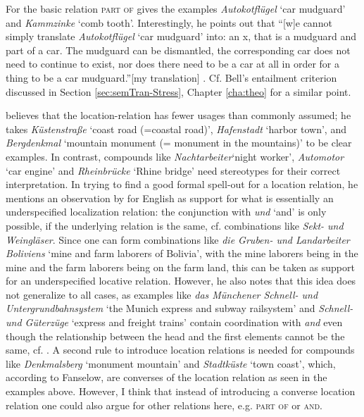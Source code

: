 For the basic relation \textsc{part of} \citet[184--185]{Fanselow:1981}
gives the examples \emph{Autokotflügel}  `car mudguard' and \emph{Kammzinke}
`comb tooth'. Interestingly, he points out that ``[w]e cannot simply translate \emph{Autokotflügel} `car mudguard'
  into: an x, that is a mudguard and part of a car. The mudguard can
  be dismantled, the corresponding car does not need to continue to
  exist, nor does there need to be a car at all in order for a thing
  to be a car mudguard.''[my translation]
  \citet[184]{Fanselow:1981}. Cf. \nocite{Bell:2012} Bell's entailment
  criterion discussed in Section \ref{sec:semTran-Stress}, Chapter
  \ref{cha:theo} for a similar point. 



\citet[185--186]{Fanselow:1981} believes that the location-relation has fewer usages than commonly
assumed; he takes \emph{Küstenstraße} `coast road (=coastal road)',
\emph{Ha\-fen\-stadt} `harbor town', and
\emph{Bergdenkmal} `mountain monument (= monument in the mountains)' to be clear examples. In contrast, compounds like
\emph{Nachtarbeiter}\linebreak[4] `night worker', \emph{Automotor}
  `car engine' and  \emph{Rheinbrücke} `Rhine bridge' need ste\-reo\-types for
  their correct interpretation. In trying to find a good formal spell-out for a
  location relation, he mentions an observation by \citet{Warren:1978} for English
  as support for what is essentially an underspecified localization
  relation: the conjunction with \emph{und} `and' is only possible, if the
  underlying relation is the same, cf. combinations like \emph{Sekt-
    und Weingläser}. Since one can form combinations like  \emph{die Gruben- und Landarbeiter
    Boliviens} `mine and farm laborers of Bolivia', with the mine laborers being in the
  mine and the farm laborers being on the farm land, this can be taken as
  support for an underspecified locative relation. 
However, he also notes that
  this idea does not generalize to all cases, as examples like \emph{das
    Münchener Schnell- und Untergrundbahnsystem} `the Munich express and
  subway railsystem' and \emph{Schnell-
    und Güterzüge} `express and freight trains' contain coordination with \emph{and} even though
  the relationship between the head and the first elements cannot be the same,
  cf. \citet[Footnote 10]{Fanselow:1981}. A second rule to introduce location
  relations is needed for compounds like \emph{Denkmalsberg} `monument mountain' and
  \emph{Stadtküste} `town coast', which, according to Fanselow, are converses of
  the location relation as seen in the examples above. However, I
  think that instead of introducing a converse location relation one
  could also argue for other relations here, e.g. \textsc{part of} or \textsc{and}.

